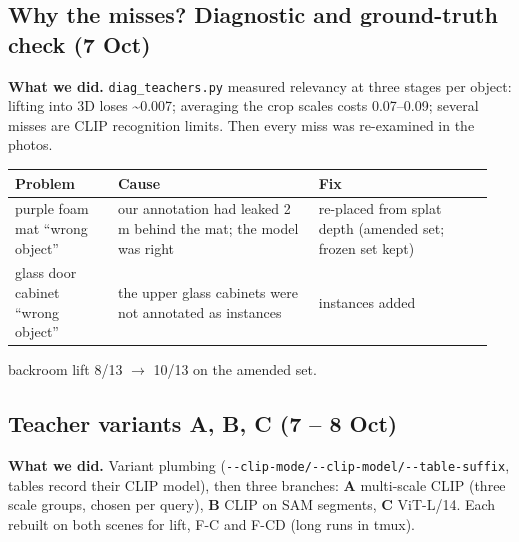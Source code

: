 \documentclass[11pt,a4paper]{article}
\newcommand{\code}[1]{\texttt{#1}}
\begin{document}
\subsection{Why the misses? Diagnostic and ground-truth check (7 Oct)}
\textbf{What we did.} \code{diag\_\allowbreak{}teachers.py} measured relevancy at three stages per object: lifting into 3D loses \textasciitilde{}0.007; averaging the crop scales costs 0.07–0.09; several misses are CLIP recognition limits. Then every miss was re-examined in the photos.

\begin{center}\small
\begin{tabular}{@{}>{\raggedright\arraybackslash}p{0.202\linewidth}>{\raggedright\arraybackslash}p{0.398\linewidth}>{\raggedright\arraybackslash}p{0.349\linewidth}@{}}
\toprule
\textbf{Problem} & \textbf{Cause} & \textbf{Fix} \\
\midrule
purple foam mat ``wrong object'' & our annotation had leaked 2 m behind the mat; the model was right & re-placed from splat depth (amended set; frozen set kept) \\
glass door cabinet ``wrong object'' & the upper glass cabinets were not annotated as instances & instances added \\
\bottomrule
\end{tabular}
\end{center}
backroom lift 8/13 $\rightarrow$ 10/13 on the amended set.

\subsection{Teacher variants A, B, C (7 – 8 Oct)}
\textbf{What we did.} Variant plumbing (\code{-{}-clip-mode/\allowbreak{}-{}-clip-model/\allowbreak{}-{}-table-suffix}, tables record their CLIP model), then three branches: \textbf{A} multi-scale CLIP (three scale groups, chosen per query), \textbf{B} CLIP on SAM segments, \textbf{C} ViT-L/14. Each rebuilt on both scenes for lift, F-C and F-CD (long runs in tmux).
\end{document}
